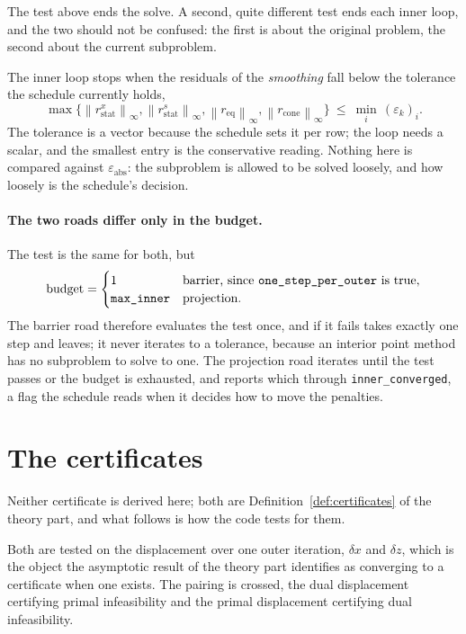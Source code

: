 \documentclass[a4paper,11pt]{book}
\theoremstyle{plain}
\theoremstyle{definition}
\theoremstyle{remark}
\numberwithin{equation}{chapter}
\numberwithin{algorithm}{chapter}
\newcommand{\norm}[1]{\left\|#1\right\|}
\begin{document}
	The test above ends the solve. A second, quite different test ends each inner
	loop, and the two should not be confused: the first is about the original
	problem, the second about the current subproblem.

	The inner loop stops when the residuals of the \emph{smoothing} fall below the
	tolerance the schedule currently holds,
	\[
	\max\bigl\{\norm{r^{x}_{\mathrm{stat}}}_\infty,
	\norm{r^{s}_{\mathrm{stat}}}_\infty,
	\norm{r_{\mathrm{eq}}}_\infty,
	\norm{r_{\mathrm{cone}}}_\infty\bigr\}
	\ \leq\ \min_i\,(\varepsilon_k)_i .
	\]
	The tolerance is a vector because the schedule sets it per row; the loop needs
	a scalar, and the smallest entry is the conservative reading. Nothing here is
	compared against $\varepsilon_{\mathrm{abs}}$: the subproblem is allowed to be
	solved loosely, and how loosely is the schedule's decision.

	\paragraph{The two roads differ only in the budget.}
	The test is the same for both, but
	\[
	\text{budget}=
	\begin{cases}
		1 & \text{barrier, since \texttt{one\_step\_per\_outer} is true},\\
		\texttt{max\_inner} & \text{projection}.
	\end{cases}
	\]
	The barrier road therefore evaluates the test once, and if it fails takes
	exactly one step and leaves; it never iterates to a tolerance, because an
	interior point method has no subproblem to solve to one. The projection road
	iterates until the test passes or the budget is exhausted, and reports which
	through \texttt{inner\_converged}, a flag the schedule reads when it decides
	how to move the penalties.

	\section{The certificates}

	Neither certificate is derived here; both are
	Definition~\ref{def:certificates} of the theory part, and what follows is how
	the code tests for them.

	Both are tested on the displacement over one outer iteration, $\delta x$ and
	$\delta z$, which is the object the asymptotic result of the theory part
	identifies as converging to a certificate when one exists. The pairing is
	crossed, the dual displacement certifying primal infeasibility and the primal
	displacement certifying dual infeasibility.
\end{document}
